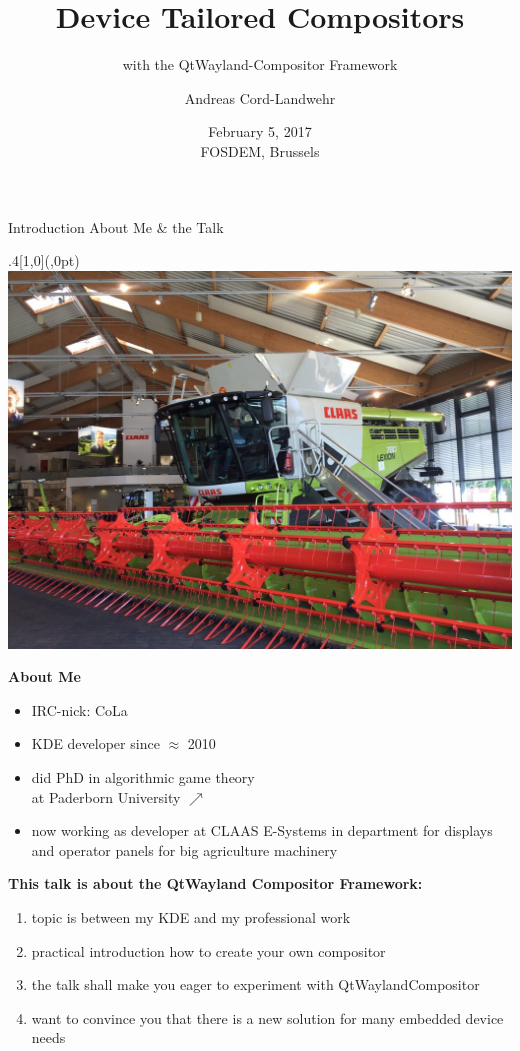 \documentclass[ucs,9pt]{beamer}
\title[Device Tailored Wayland Compositors]{Device Tailored Compositors}
\subtitle{with the QtWayland-Compositor Framework}
\author{Andreas Cord-Landwehr}
\date{\textnormal{February 5, 2017\\[\medskipamount] FOSDEM, Brussels}}
\begin{document}
\maketitle

\begin{frame}
    {Introduction}
    {About Me \& the Talk}

    \begin{textblock*}{.4\paperwidth}[1,0](\paperwidth,0pt)%
        \includegraphics[width=\linewidth]{lexion.jpg}
    \end{textblock*}%

    \textbf{About Me}
    \begin{itemize}
        \item IRC-nick: CoLa
        \item KDE developer since $\approx$ 2010
        \item did PhD in algorithmic game theory\\ at Paderborn University \hspace{2.5cm}$\nearrow$
        \item now working as developer at CLAAS E-Systems in department for displays and operator panels for big agriculture machinery
    \end{itemize}
    \bigskip

    \textbf{This talk is about the QtWayland Compositor Framework:}
    \begin{enumerate}
        \item topic is between my KDE and my professional work
        \item practical introduction how to create your own compositor
        \item the talk shall make you eager to experiment with QtWaylandCompositor
        \item want to convince you that there is a new solution for many embedded device needs
    \end{enumerate}
\end{frame}
\end{document}
